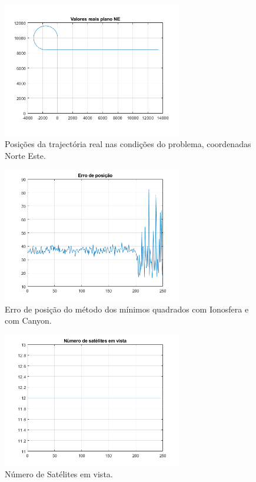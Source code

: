 \documentclass[palatino]{ist-report}
\begin{document}
\begin{figure}[ht]
	\centering
	\includegraphics[width=0.7\textwidth,trim={0 18mm 0 0},clip]{graphics/realnascondicoesdoproblema.png}
	\caption{Posições da trajectória real nas condições do problema, coordenadas Norte Este.}
	\label{real2}
\end{figure}

\begin{figure}[ht]
	\centering
	\includegraphics[width=0.7\textwidth,trim={0 7mm 0 0},clip]{graphics/erro_posicao11.png}
	\caption{Erro de posição do método dos mínimos quadrados com Ionosfera e com Canyon.}
	\label{pos11}
\end{figure}


\begin{figure}[ht]
	\centering
	\includegraphics[width=0.7\textwidth,trim={0 7mm 0 0},clip]{graphics/n_sats.png}
	\caption{Número de Satélites em vista.}
	\label{satelites1}
\end{figure}
\end{document}
